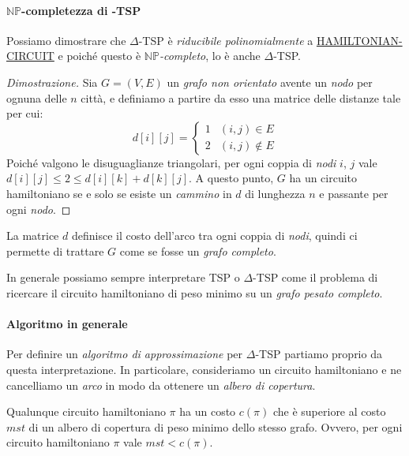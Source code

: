\paragraph{$\mathbb{NP}$-completezza di \bm{$\Delta$}-TSP}
Possiamo dimostrare che $\Delta$-TSP è \emph{riducibile polinomialmente} a
\hyperref[prob:35]{HAMILTONIAN-CIRCUIT} e poiché questo è
\emph{$\mathbb{NP}$-completo}, lo è anche $\Delta$-TSP.

\begin{proof}[Dimostrazione]
    Sia $G=(V,E)$ un \emph{grafo non orientato} avente un \emph{nodo} per ognuna
    delle $n$ città, e definiamo a partire da esso una matrice delle distanze
    tale per cui:
    \[d[i][j]=\begin{cases}
        1 & (i,j)\in E\\
        2 & (i,j)\notin E
    \end{cases}\]
    Poiché valgono le disuguaglianze triangolari, per ogni coppia di \emph{nodi}
    $i$, $j$ vale $d[i][j]\leq 2\leq d[i][k]+d[k][j]$. A questo punto, $G$ ha
    un circuito hamiltoniano se e solo se esiste un \emph{cammino} in $d$ di
    lunghezza $n$ e passante per ogni \emph{nodo}.
\end{proof}
\begin{note}
    La matrice $d$ definisce il costo dell'arco tra ogni coppia di \emph{nodi},
    quindi ci permette di trattare $G$ come se fosse un \emph{grafo completo}.
\end{note}

\noindent
In generale possiamo sempre interpretare TSP o $\Delta$-TSP come il problema di
ricercare il circuito hamiltoniano di peso minimo su un \emph{grafo pesato
completo}.

\paragraph{Algoritmo in generale}
Per definire un \emph{algoritmo di approssimazione} per $\Delta$-TSP
partiamo proprio da questa interpretazione. In particolare, consideriamo un
circuito hamiltoniano e ne cancelliamo un \emph{arco} in modo da ottenere un
\emph{albero di copertura}.

\begin{definition}
    Qualunque circuito hamiltoniano $\pi$ ha un costo $c(\pi)$ che è superiore
    al costo $mst$ di un albero di copertura di peso minimo dello stesso grafo.
    Ovvero, per ogni circuito hamiltoniano $\pi$ vale $mst<c(\pi)$.
\end{definition}


